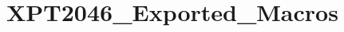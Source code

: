 \hypertarget{group___x_p_t2046___exported___macros}{}\section{X\+P\+T2046\+\_\+\+Exported\+\_\+\+Macros}
\label{group___x_p_t2046___exported___macros}
